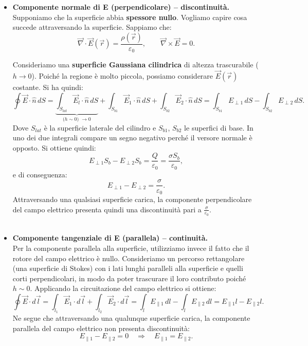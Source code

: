 \documentclass{book}
\begin{document}
\begin{itemize}
\item[\textbf{(1)}] \textbf{Componente normale di E (perpendicolare) -- discontinuità.}\\
Supponiamo che la superficie abbia \textbf{spessore nullo}.
Vogliamo capire cosa succede attraversando la superficie. Sappiamo che:
$$
\vec{\nabla}\cdot\vec{E}(\vec{r}) = \frac{\rho(\vec{r})}{\varepsilon_0},
\qquad 
\vec{\nabla}\times \vec{E} = 0.
$$

Consideriamo una \textbf{superficie Gaussiana cilindrica} di altezza trascurabile ($h \to 0$). Poiché la regione è molto piccola, possiamo considerare $\vec{E}(\vec{r})$ costante. Si ha quindi:
$$
\oint \vec{E}\cdot \hat{n}\,dS 
= \underbrace{\int_{S_{lat}}\vec{E}_l\cdot \hat{n}\,dS}_{\text{($h \sim 0$) $\to 0$}} 
+ \int_{S_{b1}}\vec{E}_1\cdot \hat{n}\,dS 
+ \int_{S_{b2}}\vec{E}_2\cdot \hat{n}\,dS 
= \int_{S_{b1}}E_{\perp 1}\,dS - \int_{S_{b2}}E_{\perp 2}\,dS.
$$
Dove $S_{lat}$ è la superficie laterale del cilindro e $S_{b1}$, $S_{b2}$ le superfici di base. In uno dei due integrali compare un segno negativo perché il versore normale è opposto. Si ottiene quindi:
$$
E_{\perp 1} S_b - E_{\perp 2} S_b = \frac{Q}{\varepsilon_0} = \frac{\sigma S_b}{\varepsilon_0},
$$
e di conseguenza:
$$
E_{\perp 1} - E_{\perp 2} = \frac{\sigma}{\varepsilon_0}.
$$
Attraversando una qualsiasi superficie carica, la componente perpendicolare del campo elettrico presenta quindi una discontinuità pari a $\frac{\sigma}{\varepsilon_0}$.
\\
\\
\item[\textbf{(2)}] \textbf{Componente tangenziale di E (parallela) -- continuità.}\\
Per la componente parallela alla superficie, utilizziamo invece il fatto che il rotore del campo elettrico è nullo. 
Consideriamo un percorso rettangolare (una superficie di Stokes) con i lati lunghi paralleli alla superficie e quelli corti perpendicolari, in modo da poter trascurare il loro contributo poiché $h \sim 0$. 
Applicando la circuitazione del campo elettrico si ottiene:
$$
\oint \vec{E}\cdot d\vec{l} = 
\int_{l_1}\vec{E}_1\cdot d\vec{l} + \int_{l_2}\vec{E}_2\cdot d\vec{l} 
= \int_{l}E_{\parallel 1}\,dl - \int_{l}E_{\parallel 2}\,dl
= E_{\parallel 1}l - E_{\parallel 2}l.
$$
Ne segue che attraversando una qualunque superficie carica, la componente parallela del campo elettrico non presenta discontinuità:
$$
E_{\parallel 1} - E_{\parallel 2} = 0 \quad \Rightarrow \quad E_{\parallel 1} = E_{\parallel 2}.
$$
\
\end{itemize}
\end{document}
